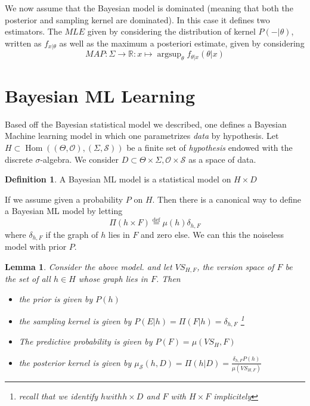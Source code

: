 \documentclass{book}
\theoremstyle{plain}
\newtheorem{lemma}[corollary]{Lemma}
\theoremstyle{definition}
\newtheorem{definition}[corollary]{Definition}
\DeclareMathOperator{\argsup}{argsup}
\renewcommand{\d}[1]{\mathbb{#1}}
\newcommand{\define}{\stackrel{\operatorname{def}}{=}}
\newcommand{\fun}{\mapsto}
\DeclareMathOperator{\Hom}{Hom}
\newcommand{\mor}{\longrightarrow}
\renewcommand{\r}[1]{\mathcal{#1}}
\renewcommand{\r}[1]{\mathcal{#1}}
\begin{document}
We now assume that the Bayesian model is dominated (meaning that both the posterior and sampling kernel are dominated). 
In this case it defines two estimators. The $MLE$ given by considering the distribution of kernel $P(- \vert \theta)$, written as $f_{x\vert \theta}$ as well as the maximum a posteriori estimate, given by considering
\[
MAP: \Sigma \mor \d{R}: x \fun \argsup_\theta f_{\theta \vert x}(\theta \vert x)
\] 
 
\section{Bayesian ML Learning} 
 
Based off the Bayesian statistical model we described, one defines a Bayesian Machine learning  model in which one parametrizes \emph{data} by hypothesis.
 Let $H\subset \Hom((\Theta,\r{O}),(\Sigma,\r{S}))$ be a finite set of \emph{hypothesis} endowed with the discrete $\sigma$-algebra. We consider  $D\subset \Theta\times \Sigma, \r{O}\times \r{S}$ as a space  of data.

\begin{definition}
A Bayesian ML model is a statistical model on $H\times D$	
\end{definition}


If we assume given a probability $P$ on $H$. Then there is a canonical way to define a Bayesian ML model by letting
\[
\Pi(h\times F)\define \mu(h)\delta_{h,F}
\]
where $\delta_{h,F}$ if the graph of $h$ lies in $F$ and zero else. We can this the noiseless model with prior $P$.

\begin{lemma}
Consider the above model. and let $VS_{H,F}$, the version space of $F$ be the set of all $h \in H$ whose graph lies in $F$. Then
\begin{itemize}
\item the prior is given by $P(h)$
\item the sampling kernel is given by $P(E\vert h)=\Pi(F\vert h)=\delta_{h,F}$
\footnote{recall that we identify $h with h\times D$ and $F$ with $H\times F$ implicitely}
\item The predictive probability is	given by $P(F)= \mu(VS_H,F)$

\item the posterior kernel is given by $\mu_\r{S}(h,D)=\Pi(h\vert D)=\frac{\delta_{h,F}P(h)}{\mu(VS_{H,F})}$
\end{itemize}
\end{lemma}
\end{document}
